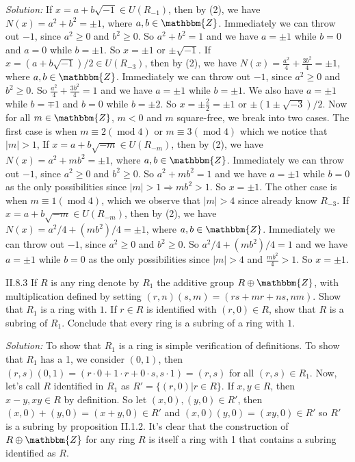 \documentclass{letter}
\newcommand{\tmem}[1]{{\em #1\/}}
\newcommand{\tmop}[1]{\ensuremath{\operatorname{#1}}}
\begin{document}
{\tmem{Solution:}} If $x = a + b \sqrt{- 1} \in U (R_{- 1})$, then by (2), we
have $N (x) = a^2 + b^2 = \pm 1$, where $a, b \in \mathbbm{Z}$. Immediately we
can throw out $- 1$, since $a^2 \geq 0$ and $b^2 \geq 0$. So $a^2 + b^2 = 1$
and we have $a = \pm 1$ while $b = 0$ and $a = 0$ while $b = \pm 1$. So $x =
\pm 1$ or $\pm \sqrt{- 1}$. If $x = (a + b \sqrt{- 1}) / 2 \in U (R_{- 3})$,
then by (2), we have $N (x) = \frac{a^2}{4} + \frac{3 b^2}{4} = \pm 1$, where
$a, b \in \mathbbm{Z}$. Immediately we can throw out $- 1$, since $a^2 \geq 0$
and $b^2 \geq 0$. So $\frac{a^2}{4} + \frac{3 b^2}{4} = 1$ and we have $a =
\pm 1$ while $b = \pm 1$. We also have $a = \pm 1$ while $b = \mp 1$ and $b =
0$ while $b = \pm 2$. So $x = \pm \frac{2}{2} = \pm 1$ or $\pm (1 \pm \sqrt{-
3}) / 2$. Now for all $m \in \mathbbm{Z}$, $m < 0$ and $m$ square-free, we
break into two cases. The first case is when $m \equiv 2 (\tmop{mod} 4)$ or $m
\equiv 3 (\tmop{mod} 4)$ which we notice that $|m| > 1$, If $x = a + b \sqrt{-
m} \in U (R_{- m})$, then by (2), we have $N (x) = a^2 + m b^2 = \pm 1$, where
$a, b \in \mathbbm{Z}$. Immediately we can throw out $- 1$, since $a^2 \geq 0$
and $b^2 \geq 0$. So $a^2 + m b^2 = 1$ and we have $a = \pm 1$ while $b = 0$
as the only possibilities since $|m| > 1 \Rightarrow m b^2 > 1$. So $x = \pm
1$. The other case is when $m \equiv 1 (\tmop{mod} 4)$, which we observe that
$|m| > 4$ since already know $R_{- 3}$. If $x = a + b \sqrt{- m} \in U (R_{-
m})$, then by (2), we have $N (x) = a^2 / 4 + (m b^2) / 4 = \pm 1$, where $a,
b \in \mathbbm{Z}$. Immediately we can throw out $- 1$, since $a^2 \geq 0$ and
$b^2 \geq 0$. So $a^2 / 4 + (m b^2) / 4 = 1$ and we have $a = \pm 1$ while $b
= 0$ as the only possibilities since $|m| > 4$ and $\frac{m b^2}{4} > 1$. So
$x = \pm 1$.

II.8.3 If $R$ is any ring denote by $R_1$ the additive group $R \oplus
\mathbbm{Z}$, with multiplication defined by setting $(r, n) (s, m) = (r s + m
r + n s, n m)$. Show that $R_1$ is a ring with $1$. If $r \in R$ is identified
with $(r, 0) \in R$, show that $R$ is a subring of $R_1$. Conclude that every
ring is a subring of a ring with $1$.

{\tmem{Solution:}} To show that $R_1$ is a ring is simple verification of
definitions. To show that $R_1$ has a 1, we consider $(0, 1)$, then $(r, s)
(0, 1) = (r \cdot 0 + 1 \cdot r + 0 \cdot s, s \cdot 1) = (r, s)$ for all $(r,
s) \in R_1$. Now, let's call $R$ identified in $R_1$ as $R' =\{(r, 0) | r \in
R\}$. If $x, y \in R$, then $x - y, x y \in R$ by definition. So let $(x, 0),
(y, 0) \in R'$, then $(x, 0) + (y, 0) = (x + y, 0) \in R'$ and $(x, 0) (y, 0)
= (x y, 0) \in R'$ so $R'$ is a subring by proposition II.1.2. It's clear that
the construction of $R \oplus \mathbbm{Z}$ for any ring $R$ is itself a ring
with 1 that contains a subring identified as $R$.
\end{document}
